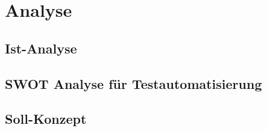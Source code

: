 \newpage
\section{Analyse}

\subsection{Ist-Analyse}

\subsection{SWOT Analyse für Testautomatisierung}

\subsection{Soll-Konzept}
